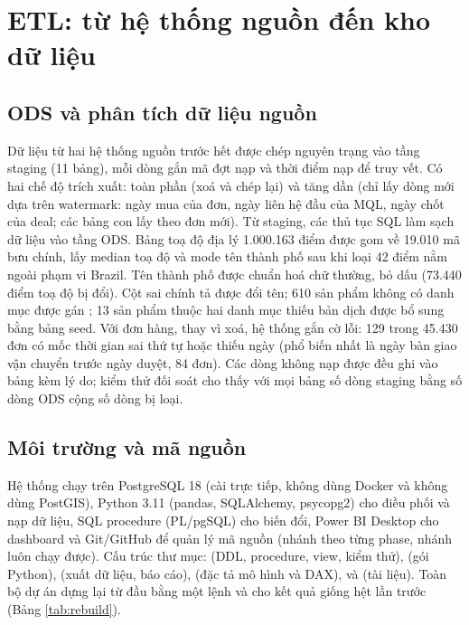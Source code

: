\section{ETL: từ hệ thống nguồn đến kho dữ liệu}\label{sec:etl}
\subsection{ODS và phân tích dữ liệu nguồn}\label{sec:ods}
Dữ liệu từ hai hệ thống nguồn trước hết được chép nguyên trạng vào tầng staging (11 bảng), mỗi dòng gắn mã đợt nạp và thời điểm nạp để truy vết. Có hai chế độ trích xuất: toàn phần (xoá và chép lại) và tăng dần (chỉ lấy dòng mới dựa trên watermark: ngày mua của đơn, ngày liên hệ đầu của MQL, ngày chốt của deal; các bảng con lấy theo đơn mới). Từ staging, các thủ tục SQL làm sạch dữ liệu vào tầng ODS. Bảng toạ độ địa lý 1.000.163 điểm được gom về 19.010 mã bưu chính, lấy median toạ độ và mode tên thành phố sau khi loại 42 điểm nằm ngoài phạm vi Brazil. Tên thành phố được chuẩn hoá chữ thường, bỏ dấu (73.440 điểm toạ độ bị đổi). Cột sai chính tả  được đổi tên; 610 sản phẩm không có danh mục được gán ; 13 sản phẩm thuộc hai danh mục thiếu bản dịch được bổ sung bằng bảng seed. Với đơn hàng, thay vì xoá, hệ thống gắn cờ lỗi: 129 trong 45.430 đơn có mốc thời gian sai thứ tự hoặc thiếu ngày (phổ biến nhất là ngày bàn giao vận chuyển trước ngày duyệt, 84 đơn). Các dòng không nạp được đều ghi vào bảng  kèm lý do; kiểm thử đối soát cho thấy với mọi bảng số dòng staging bằng số dòng ODS cộng số dòng bị loại.



\subsection{Môi trường và mã nguồn}
Hệ thống chạy trên PostgreSQL 18 (cài trực tiếp, không dùng Docker và không dùng PostGIS), Python 3.11 (pandas, SQLAlchemy, psycopg2) cho điều phối và nạp dữ liệu, SQL procedure (PL/pgSQL) cho biến đổi, Power BI Desktop cho dashboard và Git/GitHub để quản lý mã nguồn (nhánh theo từng phase, nhánh  luôn chạy được). Cấu trúc thư mục:  (DDL, procedure, view, kiểm thử),  (gói Python),  (xuất dữ liệu, báo cáo),  (đặc tả mô hình và DAX),  và  (tài liệu). Toàn bộ dự án dựng lại từ đầu bằng một lệnh  và cho kết quả giống hệt lần trước (Bảng \ref{tab:rebuild}).


